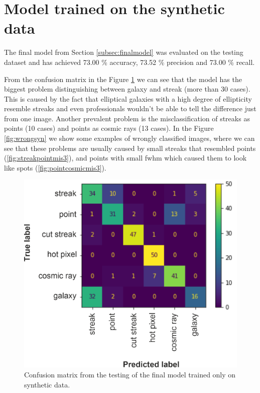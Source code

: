 \section{Model trained on the synthetic data}

The final model from Section \ref{subsec:finalmodel} was evaluated on the testing dataset and has achieved 73.00 \% accuracy, 73.52 \% precision and 73.00 \% recall. 

From the confusion matrix in the Figure \ref{img:confmatrixsyn} we can see that the model has the biggest problem distinguishing between galaxy and streak (more than 30 cases). This is caused by the fact that elliptical galaxies with a high degree of ellipticity resemble streaks and even professionals wouldn't be able to tell the difference just from one image. Another prevalent problem is the misclassification of streaks as points (10 cases) and points as cosmic rays (13 cases). In the Figure \ref{fig:wrongsyn} we show some examples of wrongly classified images, where we can see that these problems are usually caused by small streaks that resembled points (\ref{fig:streakpointmis3}), and points with small fwhm which caused them to look like spots (\ref{fig:pointcosmicmis3}).   

\begin{figure}[h]
    \centering
    \includegraphics[width=.5\textwidth]{images/confusionmatrix51.png}
    \caption{Confusion matrix from the testing of the final model trained only on synthetic data.}
    \label{img:confmatrixsyn}
\end{figure}

